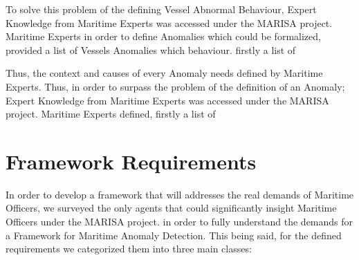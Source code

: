 To solve this problem of the defining Vessel Abnormal Behaviour, Expert Knowledge from Maritime Experts was accessed under the MARISA project. Maritime Experts in order to define Anomalies which could be formalized, provided a list of Vessels Anomalies which behaviour. firstly a list of  





Thus, the context and causes of every Anomaly needs defined by Maritime Experts. Thus, in order to surpass the problem of the definition of an Anomaly; Expert Knowledge from Maritime Experts was accessed under the MARISA project. Maritime Experts defined, firstly a list of  

\section{Framework Requirements}
\label{section: Framework Requirements}
In order to develop a framework that will addresses the real demands of Maritime Officers, we surveyed the only agents that could significantly insight Maritime Officers under the MARISA project. in order to fully understand the demands for a Framework for Maritime Anomaly Detection.
This being said, for the defined requirements we categorized them into three main classes:

